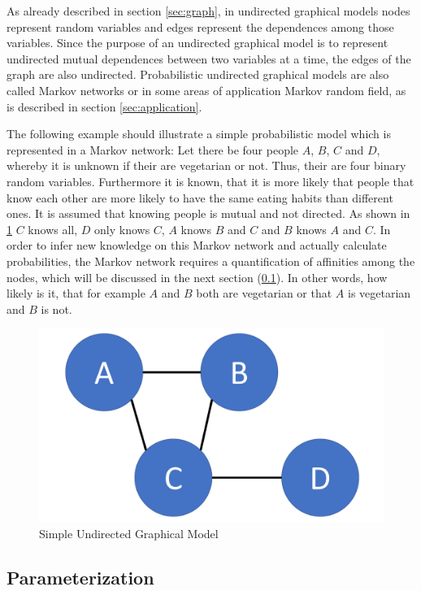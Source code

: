As already described in section \ref{sec:graph}, in undirected graphical models nodes represent random variables and edges represent the dependences among those variables. Since the purpose of an undirected graphical model is to represent undirected mutual dependences between two variables at a time, the edges of the graph are also undirected. Probabilistic undirected graphical models are also called Markov networks or in some areas of application Markov random field, as is described in section \ref{sec:application}.

The following example should illustrate a simple probabilistic model which is represented in a Markov network: Let there be four people $A$, $B$, $C$ and $D$, whereby it is unknown if their are vegetarian or not. Thus, their are four binary random variables. Furthermore it is known, that it is more likely that people that know each other are more likely to have the same eating habits than different ones. It is assumed that knowing people is mutual and not directed. As shown in \ref{fig:basic} $C$ knows all, $D$ only knows $C$, $A$ knows $B$ and $C$ and $B$ knows $A$ and $C$. In order to infer new knowledge on this Markov network and actually calculate probabilities, the Markov network requires a quantification of affinities among the nodes, which will be discussed in the next section (\ref{sec:param}). In other words, how likely is it, that for example $A$ and $B$ both are vegetarian or that $A$ is vegetarian and $B$ is not.

\begin{figure}[htpb]
  \centering
  	\includegraphics[scale=0.3]{img/basic.pdf} 
  \caption{Simple Undirected Graphical Model}
  \label{fig:basic}
\end{figure}

\subsection{Parameterization} \label{sec:param}

